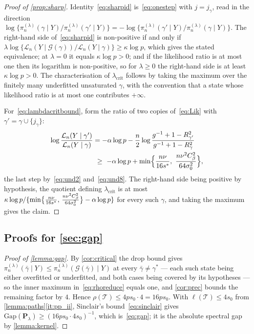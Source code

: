 \begin{proof}[Proof of \cref{prop:sharp}]
    Identity~\eqref{eq:sharpid} is~\eqref{eq:onestep} with
    $j=j_\gamma$, read in the direction
    $\log\{\pi_n^{(\lambda)}(\gamma\mid Y)/
    \pi_n^{(\lambda)}(\gamma'\mid Y)\}
    =-\log\{\pi_n^{(\lambda)}(\gamma'\mid Y)/
    \pi_n^{(\lambda)}(\gamma\mid Y)\}$. The right-hand side
    of~\eqref{eq:sharpid} is non-positive if and only if
    $\lambda\log\{\mathcal{L}_n(Y\mid\mathcal{G}(\gamma))/
    \mathcal{L}_n(Y\mid\gamma)\}\geq\kappa\log p$, which gives the stated
    equivalence; at $\lambda=0$ it equals $\kappa\log p>0$; and if the
    likelihood ratio is at most one then its logarithm is non-positive, so
    for $\lambda\geq0$ the right-hand side is at least $\kappa\log p>0$.
    The characterisation of $\lambda_{\mathrm{crit}}$ follows by taking
    the maximum over the finitely many underfitted unsaturated $\gamma$,
    with the convention that a state whose likelihood ratio is at most one
    contributes $+\infty$.

    For~\eqref{eq:lambdacritbound}, form the ratio of two copies
    of~\eqref{eq:Lik} with $\gamma'=\gamma\cup\{j_\gamma\}$:
    \begin{align*}
        \log\frac{\mathcal{L}_n(Y\mid\gamma')}
        {\mathcal{L}_n(Y\mid\gamma)}
        &=-\alpha\log p
        -\frac n2\log\frac{g^{-1}+1-R^{2}_{\gamma'}}
        {g^{-1}+1-R^{2}_{\gamma}}\\
        &\ \geq\ -\alpha\log p+\min\Bigl\{\frac{n\nu}{16s^{\ast}},\ \frac{n\nu^{2}C_\beta^{2}}{64\sigma_0^{2}}\Bigr\} ,
    \end{align*}
    the last step by~\eqref{eq:und2} and~\eqref{eq:und8}. The right-hand
    side being positive by hypothesis, the quotient defining
    $\lambda_{\mathrm{crit}}$ is at most
    $\kappa\log p/\{\min\bigl\{\tfrac{n\nu}{16s^{\ast}},\, \tfrac{n\nu^{2}C_\beta^{2}}{64\sigma_0^{2}}\bigr\}-\alpha\log p\}$ for every such
    $\gamma$, and taking the maximum gives the claim.
\end{proof}

\subsection{Proofs for \cref{sec:gap}}
\label{sub:appgap}

\begin{proof}[Proof of \cref{lemma:gap}]
    By \cref{cor:critical} the drop bound gives
    $\pi_n^{(\lambda)}(\bar\gamma\mid Y)\leq
    \pi_n^{(\lambda)}(\mathcal{G}(\bar\gamma)\mid Y)$ at every
    $\bar\gamma\neq\gamma^{\ast}$ --- each such state being either
    overfitted or underfitted, and both cases being covered by its
    hypotheses --- so the inner maximum in~\eqref{eq:rhoreduce} equals
    one, and \cref{cor:prec} bounds the remaining factor by $4$. Hence
    $\rho(\mathcal{T})\leq4ps_0\cdot4=16ps_0$. With
    $\ell(\mathcal{T})\leq4s_0$ from
    \cref{lemma:paths}\ref{it:pp_ii}, Sinclair's
    bound~\eqref{eq:sinclair} gives
    $\mathrm{Gap}(\mathbf{P}_\lambda)\geq(16ps_0\cdot4s_0)^{-1}$, which
    is~\eqref{eq:gap}; it is the absolute spectral gap by
    \cref{lemma:kernel}.
\end{proof}

